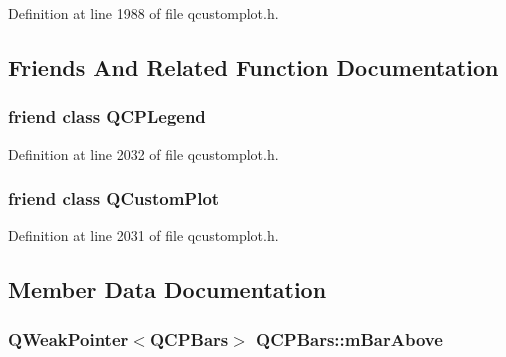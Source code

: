 Definition at line 1988 of file qcustomplot.\-h.



\subsection{Friends And Related Function Documentation}
\hypertarget{class_q_c_p_bars_a8429035e7adfbd7f05805a6530ad5e3b}{
\subsubsection[{Q\-C\-P\-Legend}]{\setlength{\rightskip}{0pt plus 5cm}friend class {\bf Q\-C\-P\-Legend}\hspace{0.3cm}{\ttfamily [friend]}}}\label{class_q_c_p_bars_a8429035e7adfbd7f05805a6530ad5e3b}


Definition at line 2032 of file qcustomplot.\-h.

\hypertarget{class_q_c_p_bars_a1cdf9df76adcfae45261690aa0ca2198}{
\subsubsection[{Q\-Custom\-Plot}]{\setlength{\rightskip}{0pt plus 5cm}friend class {\bf Q\-Custom\-Plot}\hspace{0.3cm}{\ttfamily [friend]}}}\label{class_q_c_p_bars_a1cdf9df76adcfae45261690aa0ca2198}


Definition at line 2031 of file qcustomplot.\-h.



\subsection{Member Data Documentation}
\hypertarget{class_q_c_p_bars_ac321b2b63af9473164580e1bf4ce2b81}{
\subsubsection[{m\-Bar\-Above}]{\setlength{\rightskip}{0pt plus 5cm}Q\-Weak\-Pointer$<${\bf Q\-C\-P\-Bars}$>$ Q\-C\-P\-Bars\-::m\-Bar\-Above\hspace{0.3cm}{\ttfamily [protected]}}}\label{class_q_c_p_bars_ac321b2b63af9473164580e1bf4ce2b81}


